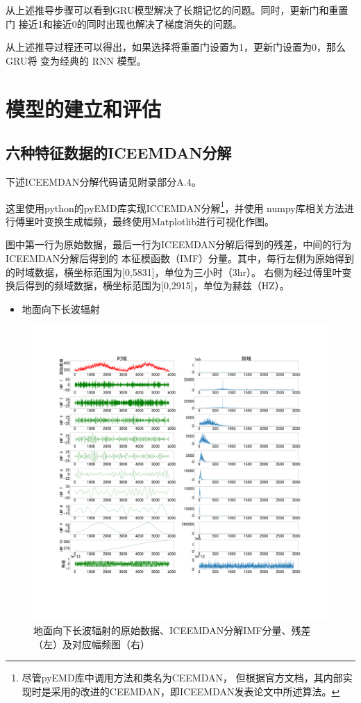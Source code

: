\documentclass[AutoFakeBold]{LZUThesis}
\begin{document}
从上述推导步骤可以看到GRU模型解决了长期记忆的问题。同时，更新门和重置门
接近1和接近0的同时出现也解决了梯度消失的问题。

从上述推导过程还可以得出，如果选择将重置门设置为1，更新门设置为0，那么GRU将
变为经典的 RNN 模型。



\chapter{模型的建立和评估}
\section{六种特征数据的ICEEMDAN分解}
下述ICEEMDAN分解代码请见附录部分A.4。

这里使用python的pyEMD库实现ICCEMDAN分解\footnote{尽管pyEMD库中调用方法和类名为CEEMDAN，
但根据官方文档，其内部实现时是采用的改进的CEEMDAN，即ICEEMDAN发表论文中所述算法。}，并使用
numpy库相关方法进行傅里叶变换生成幅频，最终使用Matplotlib进行可视化作图。

图中第一行为原始数据，最后一行为ICEEMDAN分解后得到的残差，中间的行为ICEEMDAN分解后得到的
本征模函数（IMF）分量。其中，每行左侧为原始得到的时域数据，横坐标范围为[0,5831]，单位为三小时（3hr）。
右侧为经过傅里叶变换后得到的频域数据，横坐标范围为[0,2915]，单位为赫兹（HZ）。

\begin{itemize}
    \item[1. ] 地面向下长波辐射
\end{itemize}

\begin{figure}[H]
	\centering
    \includegraphics[width=1\textwidth]{figures/lrad.pdf}
    \caption{地面向下长波辐射的原始数据、ICEEMDAN分解IMF分量、残差（左）及对应幅频图（右）}
    \label{fig_lrad}
\end{figure}
\end{document}
